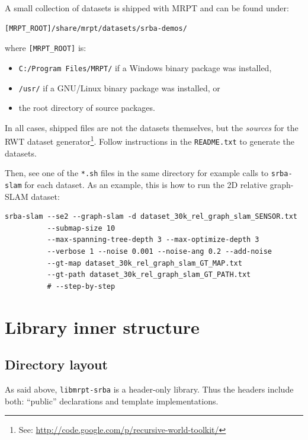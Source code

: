 \documentclass[a4paper,11pt]{article}
\begin{document}
A small collection of datasets is shipped with MRPT and can be found under:

\begin{lstlisting}
[MRPT_ROOT]/share/mrpt/datasets/srba-demos/
\end{lstlisting}

\noindent where \texttt{[MRPT\_ROOT]} is: 
\begin{itemize}
 \item \texttt{C:/Program Files/MRPT/} if a Windows binary package was installed,
 \item \texttt{/usr/} if a GNU/Linux binary package was installed, or
 \item the root directory of source packages.
\end{itemize}

In all cases, shipped files are not the datasets themselves, but the \emph{sources}
for the RWT dataset generator\footnote{See: 
\href{http://code.google.com/p/recursive-world-toolkit/}{http://code.google.com/p/recursive-world-toolkit/}}. 
Follow instructions in the \texttt{README.txt} to generate the datasets. 

Then, see one of the \texttt{*.sh} files in the same directory for example calls to \texttt{srba-slam} for each dataset. 
As an example, this is how to run the 2D relative graph-SLAM dataset:


\begin{lstlisting}
srba-slam --se2 --graph-slam -d dataset_30k_rel_graph_slam_SENSOR.txt 
          --submap-size 10 
          --max-spanning-tree-depth 3 --max-optimize-depth 3
          --verbose 1 --noise 0.001 --noise-ang 0.2 --add-noise 
          --gt-map dataset_30k_rel_graph_slam_GT_MAP.txt 
          --gt-path dataset_30k_rel_graph_slam_GT_PATH.txt 
          # --step-by-step 
\end{lstlisting}





\newpage
\section{Library inner structure}

\subsection{Directory layout}

As said above, \texttt{libmrpt-srba} is a header-only library. 
Thus the headers include both: ``public'' declarations and template implementations. 
\end{document}
